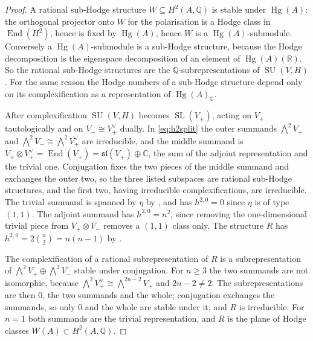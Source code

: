 \documentclass[11pt,reqno]{amsart}
\theoremstyle{plain}
\theoremstyle{definition}
\theoremstyle{remark}
\newcommand{\QQ}{\mathbb{Q}}
\newcommand{\RR}{\mathbb{R}}
\newcommand{\CC}{\mathbb{C}}
\newcommand{\HW}{W}                      %
\DeclareMathOperator{\End}{End}
\DeclareMathOperator{\Hg}{Hg}
\DeclareMathOperator{\SL}{SL}
\DeclareMathOperator{\SU}{SU}
\begin{document}
\begin{proof}
A rational sub-Hodge structure $W\subseteq H^{2}(A,\QQ)$ is stable under
$\Hg(A)$: the orthogonal projector onto $W$ for the polarisation is a Hodge
class in $\End(H^{2})$, hence is fixed by $\Hg(A)$, hence $W$ is a
$\Hg(A)$-submodule. Conversely a $\Hg(A)$-submodule is a sub-Hodge structure,
because the Hodge decomposition is the eigenspace decomposition of an element
of $\Hg(A)(\RR)$. So the rational sub-Hodge structures are the
$\QQ$-subrepresentations of $\SU(V,H)$. For the same reason the Hodge numbers
of a sub-Hodge structure depend only on its complexification as a
representation of $\Hg(A)_{\CC}$.

After complexification $\SU(V,H)$ becomes $\SL(V_{+})$, acting on $V_{+}$
tautologically and on $V_{-}\cong V_{+}^{\vee}$ dually. In \eqref{eq:h2split}
the outer summands $\bigwedge^{2}V_{+}$ and
$\bigwedge^{2}V_{-}\cong\bigwedge^{2}V_{+}^{\vee}$ are irreducible, and the
middle summand is $V_{+}\otimes V_{+}^{\vee}=\End(V_{+})
=\mathfrak{sl}(V_{+})\oplus\CC$, the sum of the adjoint representation and the
trivial one. Conjugation fixes the two pieces of the middle summand and
exchanges the outer two, so the three listed subspaces are rational sub-Hodge
structures, and the first two, having irreducible complexifications, are
irreducible. The trivial summand is spanned by $\eta$ by ,
and has $h^{2,0}=0$ since $\eta$ is of type $(1,1)$. The adjoint summand has
$h^{2,0}=n^{2}$, since removing the one-dimensional trivial piece from
$V_{+}\otimes V_{-}$ removes a $(1,1)$ class only. The structure $R$ has
$h^{2,0}=2\binom{n}{2}=n(n-1)$ by .

The complexification of a rational subrepresentation of $R$ is a
subrepresentation of $\bigwedge^{2}V_{+}\oplus\bigwedge^{2}V_{-}$ stable under
conjugation. For $n\ge3$ the two summands are not isomorphic, because
$\bigwedge^{2}V_{+}^{\vee}\cong\bigwedge^{2n-2}V_{+}$ and $2n-2\ne2$. The
subrepresentations are then $0$, the two summands and the whole; conjugation
exchanges the summands, so only $0$ and the whole are stable under it, and
$R$ is irreducible.
For $n=1$ both summands are the trivial representation, and $R$ is the plane
of Hodge classes $\HW(A)\subset H^{2}(A,\QQ)$.


\end{proof}
\end{document}
